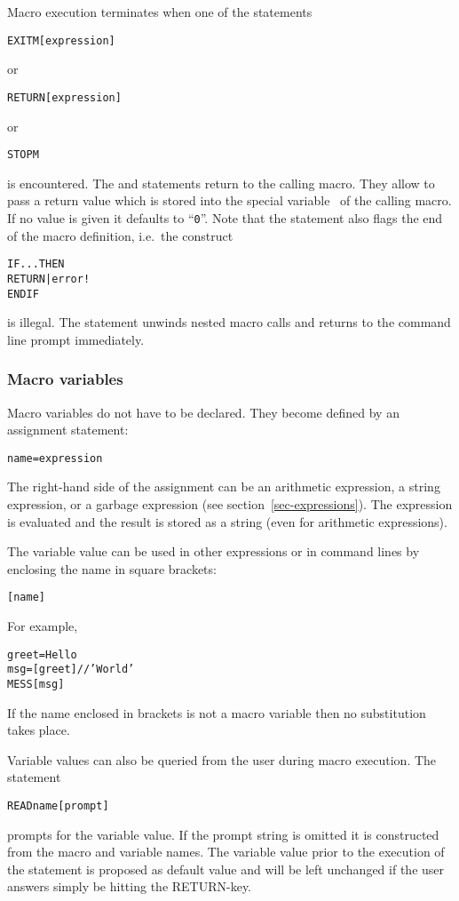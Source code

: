 Macro execution terminates when one of the statements
\begin{alltt}
   EXITM  [ expression ]
\end{alltt}
or
\begin{alltt}
   RETURN  [ expression ]
\end{alltt}
or
\begin{alltt}
   STOPM
\end{alltt}
is encountered.
The  and  statements return to the calling
macro.
They allow to pass a return value which is stored into the
special variable~\MacVar{\atsign} of the calling macro.
If no value is given it defaults to ``\texttt{0}''.
Note that the  statement also flags the end of the macro
definition, i.e.\ the construct
\begin{alltt}
IF ... THEN
  RETURN         | error!
ENDIF
\end{alltt}
is illegal.
The  statement unwinds nested macro calls and returns to
the command line prompt immediately.


\subsubsection{Macro variables}

Macro variables do not have to be declared.
They become defined by an assignment statement:
\begin{alltt}
name = expression
\end{alltt}
The right-hand side of the assignment can be an arithmetic expression,
a string expression, or a garbage expression 
(see section~\ref{sec-expressions}).
The expression is evaluated and the result is stored
as a string (even for arithmetic expressions).

The variable value can be used in other expressions or in command
lines by enclosing the name in square brackets:
\begin{alltt}
[name]
\end{alltt}
For example,
\begin{alltt}
greet = Hello
msg = [greet]//' World'
MESS [msg]
\end{alltt}
If the name enclosed in brackets is not a macro variable then no
substitution takes place.

Variable values can also be queried from the user during macro
execution.
The statement
\begin{alltt}
READ  name  [ prompt ]
\end{alltt}
prompts for the variable value.
If the prompt string is omitted it is constructed from the macro and
variable names.
The variable value prior to the execution of the  statement
is proposed as default value and
will be left unchanged if the user answers simply be hitting the
\textsc{RETURN}-key. 
